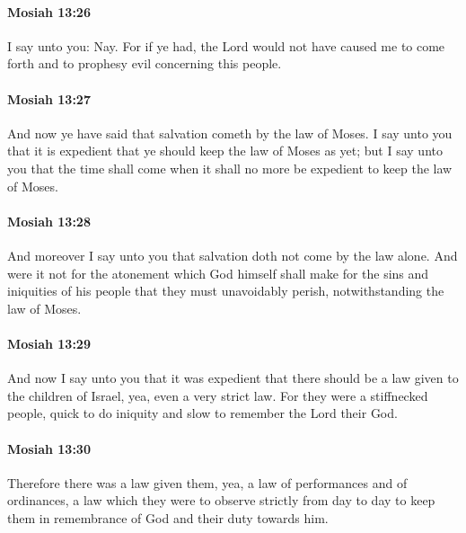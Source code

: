 		\paragraph{Mosiah 13:26} %
			\label{MOSIAH-13-26}

			I say unto you: Nay.
			For if ye had,
			the Lord would not have caused me to come forth
			and to prophesy evil concerning this people.

		\paragraph{Mosiah 13:27} %
			\label{MOSIAH-13-27}

			And now ye have said that salvation cometh by the law of Moses.
			I say unto you that it is expedient that ye should keep the law of Moses as yet;
			but I say unto you that the time shall come
			when it shall no more be expedient to keep the law of Moses.

		\paragraph{Mosiah 13:28} %
			\label{MOSIAH-13-28}

			And moreover I say unto you
			that salvation doth not come by the law alone.
			And were it not for the atonement
			which God himself shall make for the sins and iniquities of his people
			that they must unavoidably perish,
			notwithstanding the law of Moses.

		\paragraph{Mosiah 13:29} %
			\label{MOSIAH-13-29}

			And now I say unto you that it was expedient
			that there should be a law given to the children of Israel,
			yea, even a very strict law.
			For they were a stiffnecked people,
			quick to do iniquity and slow to remember the Lord their God.

		\paragraph{Mosiah 13:30} %
			\label{MOSIAH-13-30}

			Therefore there was a law given them,
			yea, a law of performances and of ordinances,
			a law which they were to observe strictly from day to day
			to keep them in remembrance of God and their duty towards him.

